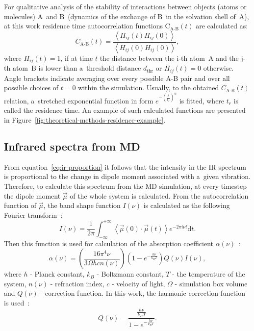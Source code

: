 For qualitative analysis of the stability of interactions between objects (atoms or molecules) A~and B~(dynamics of the exchange of B~in the solvation shell of~A), at this work residence time autocorrelation functions C$_{\text{A-B}} (t)$ are calculated as:
\begin{equation}
    C_{\text{A-B}}(t) = \frac{\left< H_{ij}(t) H_{ij}(0) \right>}{\left< H_{ij}(0) H_{ij}(0) \right>},
\end{equation}
where $H_{ij}(t) = 1$, if at time $t$ the distance between the i-th atom~A and the j-th atom~B is lower than a~threshold distance $d_{\text{thr}}$ or $H_{ij}(t) = 0$ otherwise. Angle brackets indicate averaging over every possible A-B pair and over all possible choices of $t = 0$ within the simulation. Usually, to the obtained $C_{\text{A-B}}(t)$ relation, a~stretched exponential function in form $e^{-\left( \frac{t}{t_r} \right)^{\alpha}}$ is fitted, where $t_r$ is called the residence time. An example of such calculated functions are presented in Figure~\ref{fig:theoretical-methods-residence-example}.

\subsection{Infrared spectra from MD}

From equation~\ref{eq:ir-proportion} it follows that the intensity in the IR spectrum is proportional to the change in dipole moment associated with a~given vibration. Therefore, to calculate this spectrum from the MD simulation, at every timestep the dipole moment $\vec{\mu}$ of the whole system is calculated. From the autocorrelation function of $\vec{\mu}$, the band shape function $I(\nu)$ is calculated as the following Fourier transform~\cite{ir-md-method-1,ir-md-method-2}:
\begin{equation}
    I(\nu) = \frac{1}{2\pi} \int_{-\infty}^{+\infty} \left< \vec{\mu}(0) \cdot \vec{\mu}(t) \right> e^{-2\pi i \nu t} \text{d} t.
\end{equation}
Then this function is used for calculation of the absorption coefficient $\alpha(\nu)$~\cite{ir-md-method-1,ir-md-method-3}:
\begin{equation}
    \alpha (\nu) = \left( \frac{16 \pi^4 \nu}{3\Omega h c n(\nu)} \right) \left( 1 - e^{-\frac{h \nu}{k_B T}} \right) Q(\nu) I(\nu),
\end{equation}
where $h$ - Planck constant, $k_B$ - Boltzmann constant, $T$ - the temperature of the system, $n(\nu)$ - refraction index, $c$ - velocity of light, $\Omega$ - simulation box volume and $Q(\nu)$ - correction function. In this work, the harmonic correction function is used~\cite{ir-md-method-3,ir-md-method-4}:
\begin{equation}
    Q(\nu) = \frac{\frac{h \nu}{k_B T}}{1 - e^{-\frac{h \nu}{k_B T}}}.
\end{equation}

